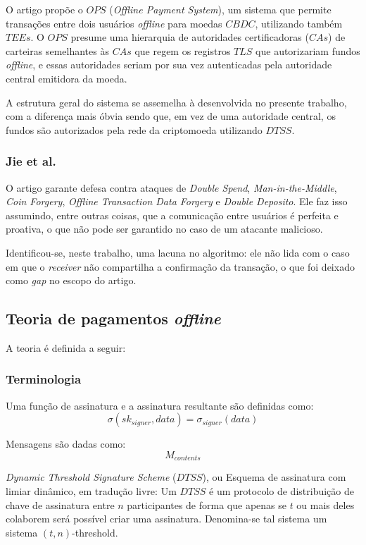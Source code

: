 \documentclass[
  12pt,
  a4paper,
  oneside,
  article,
]{abntex2}
\begin{document}
O artigo propõe o $OPS$ (\textit{Offline Payment System}), um sistema que permite transações entre dois usuários \textit{offline} para moedas $CBDC$, utilizando também $TEEs$. O $OPS$ presume uma hierarquia de autoridades certificadoras ($CAs$) de carteiras semelhantes às $CAs$ que regem os registros $TLS$ que autorizariam fundos \textit{offline}, e essas autoridades seriam por sua vez autenticadas pela autoridade central emitidora da moeda.

A estrutura geral do sistema se assemelha à desenvolvida no presente trabalho, com a diferença mais óbvia sendo que, em vez de uma autoridade central, os fundos são autorizados pela rede da criptomoeda utilizando $DTSS$.

\subsubsection{Jie et al.}

O artigo garante defesa contra ataques de \textit{Double Spend}, \textit{Man-in-the-Middle}, \textit{Coin Forgery}, \textit{Offline Transaction Data Forgery} e \textit{Double Deposito}. Ele faz isso assumindo, entre outras coisas, que a comunicação entre usuários é perfeita e proativa, o que não pode ser garantido no caso de um atacante malicioso.

Identificou-se, neste trabalho, uma lacuna no algoritmo: ele não lida com o caso em que o \textit{receiver} não compartilha a confirmação da transação, o que foi deixado como \textit{\textit{gap}} no escopo do artigo.

\subsection{Teoria de pagamentos \textit{offline}}

A teoria é definida a seguir:

\subsubsection{Terminologia}

Uma função de assinatura e a assinatura resultante são definidas como:
$$\sigma(sk_{signer}, data) = \sigma_{signer}(data)$$

Mensagens são dadas como:
$$ M_{contents} $$

\textit{Dynamic Threshold Signature Scheme} ($DTSS$), ou Esquema de assinatura com limiar dinâmico, em tradução livre:
Um $DTSS$ é um protocolo de distribuição de chave de assinatura entre $n$ participantes de forma que apenas se $t$ ou mais deles colaborem será possível criar uma assinatura. Denomina-se tal sistema um sistema $(t, n)$-threshold.
\end{document}
